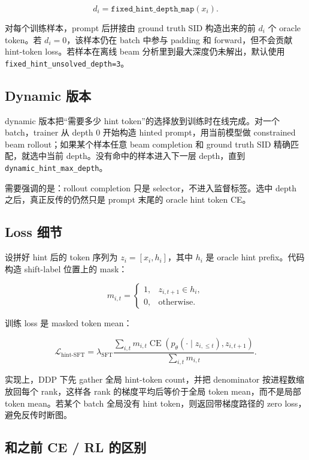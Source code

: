 \[
d_i = \texttt{fixed\_hint\_depth\_map}(x_i).
\]

对每个训练样本，prompt 后拼接由 ground truth SID 构造出来的前 \(d_i\) 个 oracle token。若 \(d_i=0\)，该样本仍在 batch 中参与 padding 和 forward，但不会贡献 hint-token loss。若样本在离线 beam 分析里到最大深度仍未解出，默认使用 \texttt{fixed\_hint\_unsolved\_depth=3}。

\subsection{Dynamic 版本}

dynamic 版本把“需要多少 hint token”的选择放到训练时在线完成。对一个 batch，trainer 从 depth 0 开始构造 hinted prompt，用当前模型做 constrained beam rollout；如果某个样本任意 beam completion 和 ground truth SID 精确匹配，就选中当前 depth。没有命中的样本进入下一层 depth，直到 \texttt{dynamic\_hint\_max\_depth}。

需要强调的是：rollout completion 只是 selector，不进入监督标签。选中 depth 之后，真正反传的仍然只是 prompt 末尾的 oracle hint token CE。

\subsection{Loss 细节}

设拼好 hint 后的 token 序列为 \(z_i = [x_i, h_i]\)，其中 \(h_i\) 是 oracle hint prefix。代码构造 shift-label 位置上的 mask：

\[
m_{i,t} =
\begin{cases}
1, & z_{i,t+1} \in h_i,\\
0, & \text{otherwise}.
\end{cases}
\]

训练 loss 是 masked token mean：

\[
\mathcal{L}_{\text{hint-SFT}}
= \lambda_{\text{SFT}}
\frac{\sum_{i,t} m_{i,t}
\operatorname{CE}\left(p_\theta(\cdot \mid z_{i,\le t}), z_{i,t+1}\right)}
{\sum_{i,t} m_{i,t}} .
\]

实现上，DDP 下先 gather 全局 hint-token count，并把 denominator 按进程数缩放回每个 rank，这样各 rank 的梯度平均后等价于全局 token mean，而不是局部 token mean。若某个 batch 全局没有 hint token，则返回带梯度路径的 zero loss，避免反传时断图。

\subsection{和之前 CE / RL 的区别}

